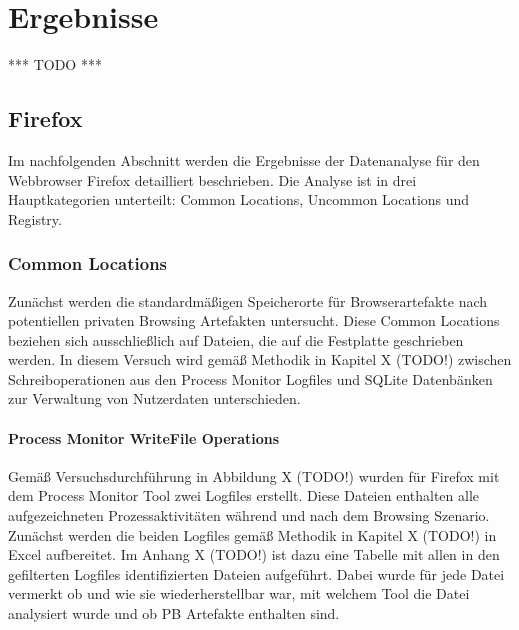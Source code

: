 \chapter{Ergebnisse}

*** TODO ***

\section{Firefox}

Im nachfolgenden Abschnitt werden die Ergebnisse der Datenanalyse für den Webbrowser Firefox detailliert beschrieben. Die Analyse ist in drei Hauptkategorien unterteilt: Common Locations, Uncommon Locations und Registry.

\subsection*{Common Locations}

Zunächst werden die standardmäßigen Speicherorte für Browserartefakte nach potentiellen privaten Browsing Artefakten untersucht. Diese Common Locations beziehen sich ausschließlich auf Dateien, die auf die Festplatte geschrieben werden. In diesem Versuch wird gemäß Methodik in Kapitel X (TODO!) zwischen Schreiboperationen aus den Process Monitor Logfiles und SQLite Datenbänken zur Verwaltung von Nutzerdaten unterschieden.

\subsubsection*{Process Monitor WriteFile Operations}

Gemäß Versuchsdurchführung in Abbildung X (TODO!) wurden für Firefox mit dem Process Monitor Tool zwei Logfiles erstellt. Diese Dateien enthalten alle aufgezeichneten Prozessaktivitäten während und nach dem Browsing Szenario.
Zunächst werden die beiden Logfiles gemäß Methodik in Kapitel X (TODO!) in Excel aufbereitet. 
Im Anhang X (TODO!) ist dazu eine Tabelle mit allen in den gefilterten Logfiles identifizierten Dateien aufgeführt.
Dabei wurde für jede Datei vermerkt
ob und wie sie wiederherstellbar war, mit welchem Tool die Datei analysiert wurde und ob PB Artefakte enthalten sind.


